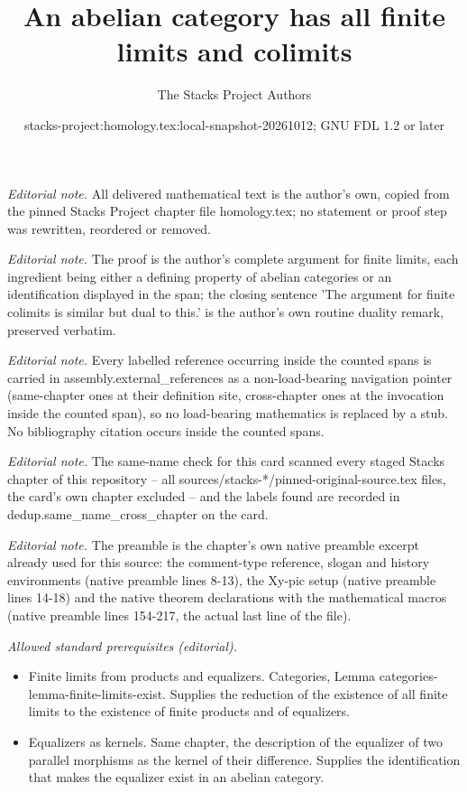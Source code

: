 \documentclass[10pt,a4paper]{amsart}
\title{An abelian category has all finite limits and colimits}
\author{The Stacks Project Authors}
\date{stacks-project:homology.tex:local-snapshot-20261012; GNU FDL 1.2 or later}
\theoremstyle{plain}
\theoremstyle{definition}
\theoremstyle{remark}
\numberwithin{equation}{subsection}
\begin{document}
\maketitle
\noindent\textit{Editorial note.} All delivered mathematical text is the author's own, copied from the pinned Stacks Project chapter file homology.tex; no statement or proof step was rewritten, reordered or removed.\par\medskip
\noindent\textit{Editorial note.} The proof is the author's complete argument for finite limits, each ingredient being either a defining property of abelian categories or an identification displayed in the span; the closing sentence 'The argument for finite colimits is similar but dual to this.' is the author's own routine duality remark, preserved verbatim.\par\medskip
\noindent\textit{Editorial note.} Every labelled reference occurring inside the counted spans is carried in assembly.external\_references as a non-load-bearing navigation pointer (same-chapter ones at their definition site, cross-chapter ones at the invocation inside the counted span), so no load-bearing mathematics is replaced by a stub. No bibliography citation occurs inside the counted spans.\par\medskip
\noindent\textit{Editorial note.} The same-name check for this card scanned every staged Stacks chapter of this repository -- all sources/stacks-*/pinned-original-source.tex files, the card's own chapter excluded -- and the labels found are recorded in dedup.same\_name\_cross\_chapter on the card.\par\medskip
\noindent\textit{Editorial note.} The preamble is the chapter's own native preamble excerpt already used for this source: the comment-type reference, slogan and history environments (native preamble lines 8-13), the Xy-pic setup (native preamble lines 14-18) and the native theorem declarations with the mathematical macros (native preamble lines 154-217, the actual last line of the file).\par\medskip
\noindent\textit{Allowed standard prerequisites (editorial).}\begin{itemize}
\item Finite limits from products and equalizers. Categories, Lemma categories-lemma-finite-limits-exist. Supplies the reduction of the existence of all finite limits to the existence of finite products and of equalizers.
\item Equalizers as kernels. Same chapter, the description of the equalizer of two parallel morphisms as the kernel of their difference. Supplies the identification that makes the equalizer exist in an abelian category.
\end{itemize}\medskip
\end{document}
